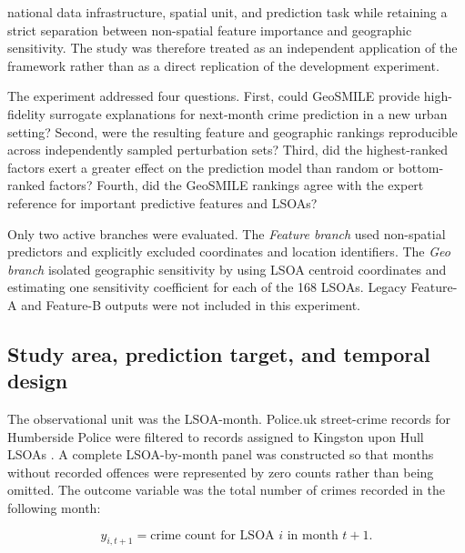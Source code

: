
national data infrastructure, spatial unit, and prediction task while retaining a strict separation between non-spatial feature importance and geographic sensitivity. The study was therefore treated as an independent application of the framework rather than as a direct replication of the development experiment.

The experiment addressed four questions. First, could GeoSMILE provide high-fidelity surrogate explanations for next-month crime prediction in a new urban setting? Second, were the resulting feature and geographic rankings reproducible across independently sampled perturbation sets? Third, did the highest-ranked factors exert a greater effect on the prediction model than random or bottom-ranked factors? Fourth, did the GeoSMILE rankings agree with the expert reference for important predictive features and LSOAs?

Only two active branches were evaluated. The \emph{Feature branch} used non-spatial predictors and explicitly excluded coordinates and location identifiers. The \emph{Geo branch} isolated geographic sensitivity by using LSOA centroid coordinates and estimating one sensitivity coefficient for each of the 168 LSOAs. Legacy Feature-A and Feature-B outputs were not included in this experiment.

\subsection{Study area, prediction target, and temporal design}
\label{sec:hull_data}

The observational unit was the LSOA-month. Police.uk street-crime records for Humberside Police were filtered to records assigned to Kingston upon Hull LSOAs \cite{policeuk}. A complete LSOA-by-month panel was constructed so that months without recorded offences were represented by zero counts rather than being omitted. The outcome variable was the total number of crimes recorded in the following month:

\begin{equation}
y_{i,t+1} = \text{crime count for LSOA } i \text{ in month } t+1.
\end{equation}

